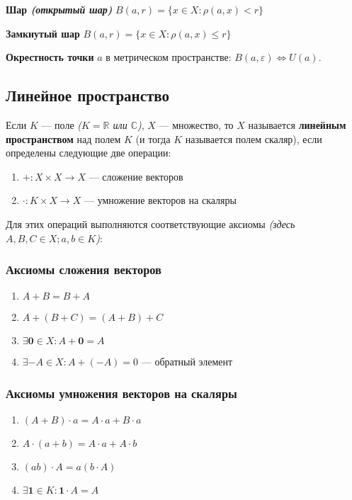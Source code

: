 \textbf{Шар \textit{(открытый шар)}} $B(a,r)=\{x\in X : \rho(a,x)<r\}$

\textbf{Замкнутый шар} $B(a,r)=\{x\in X : \rho(a,x)\leq r\}$

\textbf{Окрестность точки} $a$ в метрическом пространстве: $B(a, \varepsilon) \Leftrightarrow U(a)$.

\subsection{Линейное пространство}

Если $K$ --- поле \textit{($K=\mathbb{R}$ или $\mathbb{C}$)}, $X$ --- множество, то $X$ называется \textbf{линейным пространством} над полем $K$ (и тогда $K$ называется полем скаляр), если определены следующие две операции:
\begin{enumerate}
\item $+:X\times X \to X$ --- сложение векторов
\item $\cdot:K\times X\to X$ --- умножение векторов на скаляры
\end{enumerate}

Для этих операций выполняются соответствующие аксиомы \textit{(здесь $A,B,C\in X; a,b\in K$)}:

\subsubsection{Аксиомы сложения векторов}
\begin{enumerate}\itemsep0em
    \item $A+B=B+A$
    \item $A+(B+C)=(A+B)+C$
    \item $\exists \bm 0 \in X : A+\bm 0 = A$
    \item $\exists -A\in X : A+(-A)=0$ --- обратный элемент
\end{enumerate}

\subsubsection{Аксиомы умножения векторов на скаляры}
\begin{enumerate}\itemsep0em
    \item $(A+B)\cdot a = A\cdot a + B\cdot a$
    \item $A\cdot(a+b) = A\cdot a + A\cdot b$
    \item $(ab)\cdot A = a(b\cdot A)$
    \item $\exists \bm 1 \in K : \bm 1 \cdot A = A$
\end{enumerate}

